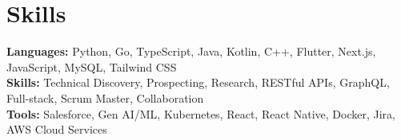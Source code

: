 \documentclass[11pt]{article}       %
\begin{document}
\vspace{-18.5pt}


\section*{Skills}
\textbf{Languages:} Python, Go, TypeScript, Java, Kotlin, C++, Flutter, Next.js, JavaScript, MySQL, Tailwind CSS\\
\textbf{Skills:} Technical Discovery, Prospecting, Research, RESTful APIs, GraphQL, Full-stack, Scrum Master, Collaboration\\
\textbf{Tools:} Salesforce, Gen AI/ML, Kubernetes, React, React Native, Docker, Jira, AWS Cloud Services\\

\vspace{-6.5pt}
\end{document}

